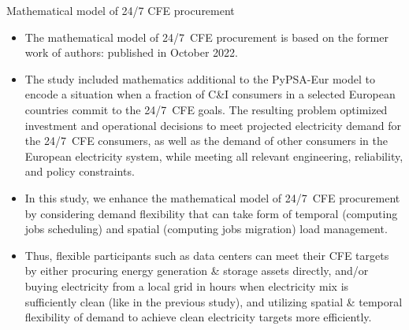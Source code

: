\begin{frame}{Mathematical model of 24/7 CFE procurement}

  {\footnotesize
  \begin{itemize}
  \item The mathematical model of 24/7~CFE procurement is based on the former work of authors:  published in October 2022.

  \item The study included mathematics additional to the PyPSA-Eur model to encode a situation when a fraction of C\&I consumers in a selected European countries commit to the 24/7~CFE goals. The resulting problem optimized investment and operational decisions to meet projected electricity demand for the 24/7~CFE consumers, as well as the demand of other consumers in the European electricity system, while meeting all relevant engineering, reliability, and policy constraints.
  
  \item In this study, we enhance the mathematical model of 24/7~CFE procurement 
  by considering demand flexibility that can take form of \alert{temporal} (computing jobs scheduling) and \alert{spatial} (computing jobs migration) load management. 
  
  \item Thus, flexible participants such as data centers can meet their CFE targets by either procuring energy generation \& storage assets directly, and/or buying electricity from a local grid in hours when electricity mix is sufficiently clean  (like in the previous study), and utilizing spatial \& temporal flexibility of demand to achieve clean electricity targets more efficiently.

  \end{itemize}
  }

\end{frame}




